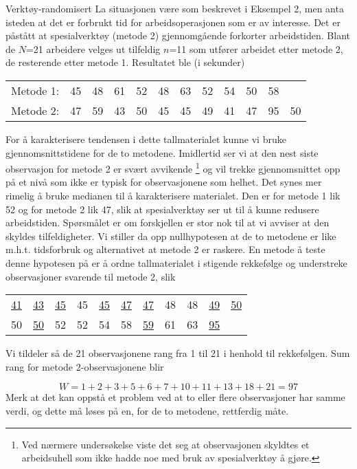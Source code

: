 \begin{eksempel}{Verktøy-randomisert}
La situasjonen være som beskrevet i Eksempel 2, men anta isteden
at det er forbrukt tid for arbeidsoperasjonen som er av interesse.
Det er påstått at spesialverktøy (metode 2) gjennomgående
forkorter arbeidstiden.  Blant de $N$=21 arbeidere velges ut tilfeldig
$n$=11 som utfører arbeidet etter metode 2, de resterende etter metode 1.
Resultatet ble (i sekunder)
\begin{center}
\begin{tabular}{lccccccccccc}
Metode 1: &  45 & 48 & 61 & 52 & 48 & 63 & 52 & 54 & 50 & 58 &   \\
Metode 2: &  47 & 59 & 43 & 50 & 45 & 45 & 49 & 41 & 47 & 95 & 50
\end{tabular}
\end{center}
For å karakterisere tendensen i dette tallmaterialet kunne vi 
bruke gjennomsnittstidene for de to metodene.  Imidlertid ser vi at
den nest siste observasjon for metode 2 er svært avvikende
\footnote{Ved nærmere undersøkelse viste det seg at observasjonen
skyldtes et arbeidsuhell som ikke hadde noe med bruk av spesialverktøy
å gjøre.} og vil trekke gjennomsnittet opp på et nivå
som ikke er typisk for observasjonene som helhet.  Det synes mer 
rimelig å bruke medianen til å karakterisere materialet.  Den
er for metode 1 lik 52 og for metode 2 lik 47, slik at spesialverktøy
ser ut til å kunne redusere arbeidstiden.  Spørsmålet er
om forskjellen er stor nok til at vi avviser at den skyldes 
tilfeldigheter.  Vi stiller da opp nullhypotesen at de to metodene
er like m.h.t. tidsforbruk og alternativet at metode 2 er raskere.  En
metode å teste denne hypotesen på er å ordne tallmaterialet
i stigende rekkefølge og understreke observasjoner svarende til
metode 2, slik
\begin{center}
\begin{tabular}{ccccccccccc}
 \underline{41} & \underline{43} & \underline{45} & 45 & \underline{45}
  & \underline{47} & \underline{47} & 48 & 48 & \underline{49} 
  &    \underline{50} \\
 50 & \underline{50}& 52 & 52 & 54 & 58 &  \underline{59} &
 61 & 63 & \underline{95} & 
\end{tabular}
\end{center}
Vi tildeler så de 21 observasjonene rang fra 1 til 21 i henhold
til rekkefølgen.  Sum rang for metode 2-observasjonene blir

\[    W = 1 + 2 + 3 + 5 + 6 + 7 + 10 + 11 + 13 + 18 + 21 = 97 \]
Merk at det kan oppstå et problem ved at to eller flere
observasjoner har samme verdi, og dette må løses på en,
for de to metodene, rettferdig måte.


\end{eksempel}

